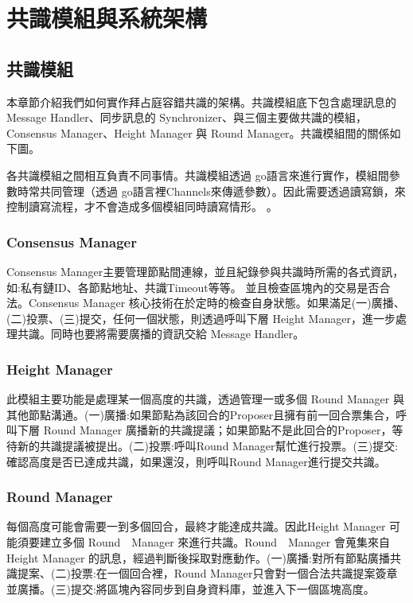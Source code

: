 \chapter{共識模組與系統架構}\label{se_5}

\section{共識模組}\label{se_5}
本章節介紹我們如何實作拜占庭容錯共識的架構。共識模組底下包含處理訊息的 Message Handler、同步訊息的 Synchronizer、與三個主要做共識的模組，Consensus Manager、Height Manager 與 Round Manager。共識模組間的關係如下圖。

各共識模組之間相互負責不同事情。共識模組透過 go語言來進行實作，模組間參數時常共同管理（透過 go語言裡Channels來傳遞參數）。因此需要透過讀寫鎖，來控制讀寫流程，才不會造成多個模組同時讀寫情形。
。



\subsection{Consensus Manager}\label{se_5} 
Consensus Manager主要管理節點間連線，並且紀錄參與共識時所需的各式資訊，如:私有鏈ID、各節點地址、共識Timeout等等。
並且檢查區塊內的交易是否合法。Consensus Manager 核心技術在於定時的檢查自身狀態。如果滿足(一)廣播、(二)投票、(三)提交，任何一個狀態，則透過呼叫下層 Height Manager，進一步處理共識。同時也要將需要廣播的資訊交給 Message Handler。
\subsection{Height Manager}\label{se_5}
此模組主要功能是處理某一個高度的共識，透過管理一或多個 Round Manager 與其他節點溝通。(一)廣播:如果節點為該回合的Proposer且擁有前一回合票集合，呼叫下層 Round Manager 廣播新的共識提議；如果節點不是此回合的Proposer，等待新的共識提議被提出。(二)投票:呼叫Round Manager幫忙進行投票。(三)提交:確認高度是否已達成共識，如果還沒，則呼叫Round Manager進行提交共識。

\subsection{Round Manager}\label{se_5}
每個高度可能會需要一到多個回合，最終才能達成共識。因此Height Manager 可能須要建立多個 Round　Manager 來進行共識。Round　Manager 會蒐集來自 Height Manager 的訊息，經過判斷後採取對應動作。(一)廣播:對所有節點廣播共識提案、(二)投票:在一個回合裡，Round Manager只會對一個合法共識提案簽章並廣播。(三)提交:將區塊內容同步到自身資料庫，並進入下一個區塊高度。


